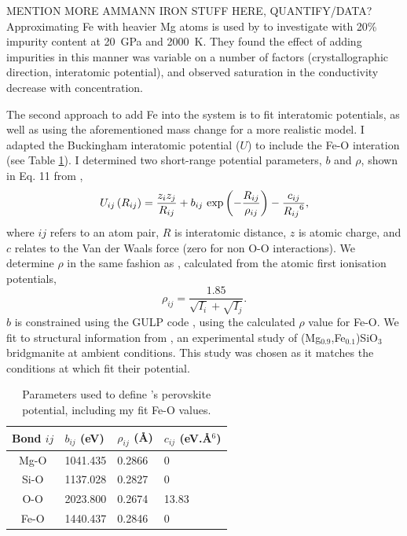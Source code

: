 MENTION MORE AMMANN IRON STUFF HERE, QUANTIFY/DATA? Approximating Fe with heavier Mg atoms is used by \citet{Ammann2014} to investigate \mgfesios with 20\% impurity content at 20~GPa and 2000~K. They found the effect of adding impurities in this manner was variable on a number of factors (crystallographic direction, interatomic potential), and observed saturation in the conductivity decrease with concentration. 

The second approach to add Fe into the \mgsios system is to fit interatomic potentials, as well as using the aforementioned mass change for a more realistic model. I adapted the \citet{Oganov2000} \mgsios Buckingham interatomic potential ($U$) to include the Fe-O interation (see Table \ref{tab:oganov_param_mod}). I determined two short-range potential parameters, $b$ and $\rho$, shown in Eq. 11 from \citet{Oganov2000},
%
\begin{equation}
U_{ij}\left ( R_{ij} \right ) = \frac{z_{i}z_{j}}{R_{ij}} + b_{ij}\ \textup{exp}\left ( - \frac{R_{ij}}{\rho_{ij}} \right ) - \frac{c_{ij}}{{R_{ij}}^{6}}, \label{og_buck}
\end{equation}
%
where $ij$ refers to an atom pair, $R$ is interatomic distance, $z$ is atomic charge, and $c$ relates to the Van der Waals force (zero for non O-O interactions). We determine $\rho$ in the same fashion as \citet{Oganov2000}, calculated from the atomic first ionisation potentials,
%
\begin{equation}
\rho_{ij} = \frac{1.85}{\sqrt{I_{i}}+\sqrt{I_{j}}}.  \label{urusov}
\end{equation}
%
$b$ is constrained using the GULP code \citep{Gale1997}, using the calculated $\rho$ value for Fe-O. We fit to structural information from \citet{Parise1990}, an experimental study of (Mg$_{0.9}$,Fe$_{0.1}$)SiO$_3$ bridgmanite at ambient conditions. This study was chosen as it matches the conditions at which \citet{Oganov2000} fit their potential. 

\begin{table}[h]
\centering
\caption[CONTENTS BIT]{\label{tab:oganov_param_mod}Parameters used to define \citet{Oganov2000}'s \mgsios perovskite potential, including my fit Fe-O values.}
\begin{tabular}{clll} 
Bond $ij$ & $b_{ij}$ (eV)  & $\rho_{ij}$ (\AA) & $c_{ij}$ (eV.\AA$^{6}$) \\ \hline
Mg-O        & 1041.435        & 0.2866                 & 0                \\
Si-O          & 1137.028        & 0.2827                 & 0                \\
O-O          & 2023.800        & 0.2674                  & 13.83 \\ 
Fe-O         & 1440.437        & 0.2846                  & 0 \\ \hline       
\end{tabular}
\end{table}

